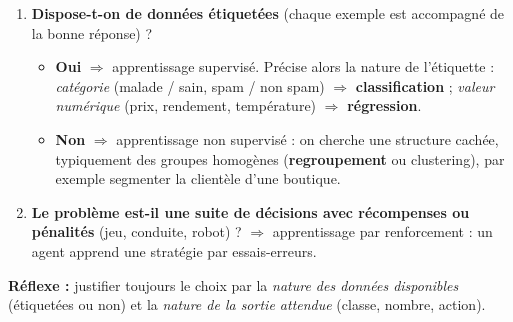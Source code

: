 \documentclass[11pt]{article}
\newcommand{\cle}[1]{{\popxbold\color{popdark}#1}}
\begin{document}
\begin{methode}
\begin{enumerate}
\item \textbf{Dispose-t-on de données étiquetées} (chaque exemple est accompagné de la bonne réponse) ?
\begin{itemize}
\item \textbf{Oui} $\Rightarrow$ \cle{apprentissage supervisé}. Précise alors la nature de l'étiquette : \emph{catégorie} (malade / sain, spam / non spam) $\Rightarrow$ \textbf{classification} ; \emph{valeur numérique} (prix, rendement, température) $\Rightarrow$ \textbf{régression}.
\item \textbf{Non} $\Rightarrow$ \cle{apprentissage non supervisé} : on cherche une structure cachée, typiquement des groupes homogènes (\textbf{regroupement} ou clustering), par exemple segmenter la clientèle d'une boutique.
\end{itemize}
\item \textbf{Le problème est-il une suite de décisions avec récompenses ou pénalités} (jeu, conduite, robot) ? $\Rightarrow$ \cle{apprentissage par renforcement} : un agent apprend une stratégie par essais-erreurs.
\end{enumerate}
\textbf{Réflexe :} justifier toujours le choix par la \emph{nature des données disponibles} (étiquetées ou non) et la \emph{nature de la sortie attendue} (classe, nombre, action).
\end{methode}
\end{document}
